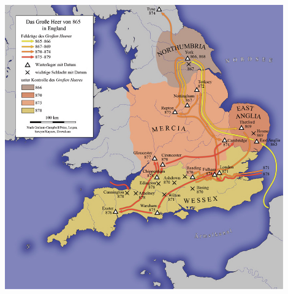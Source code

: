 \documentclass[12pt,a4paper,ngerman,openany]{book}
\begin{document}
\begin{center}
  \includegraphics[width=0.9\textwidth]{england865.png}
\end{center}
\end{document}
